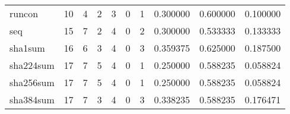 \begin{longtable}{lrrrrrrrrr}
runcon    &                                      10 &                                                  4 &                                                  2 &                                                  3 &                                                  0 &                                                  1 &                                           0.300000 &                               0.600000 &                             0.100000 \\
seq       &                                      15 &                                                  7 &                                                  2 &                                                  4 &                                                  0 &                                                  2 &                                           0.300000 &                               0.533333 &                             0.133333 \\
sha1sum   &                                      16 &                                                  6 &                                                  3 &                                                  4 &                                                  0 &                                                  3 &                                           0.359375 &                               0.625000 &                             0.187500 \\
sha224sum &                                      17 &                                                  7 &                                                  5 &                                                  4 &                                                  0 &                                                  1 &                                           0.250000 &                               0.588235 &                             0.058824 \\
sha256sum &                                      17 &                                                  7 &                                                  5 &                                                  4 &                                                  0 &                                                  1 &                                           0.250000 &                               0.588235 &                             0.058824 \\
sha384sum &                                      17 &                                                  7 &                                                  3 &                                                  4 &                                                  0 &                                                  3 &                                           0.338235 &                               0.588235 &                             0.176471 \\

\end{longtable}

